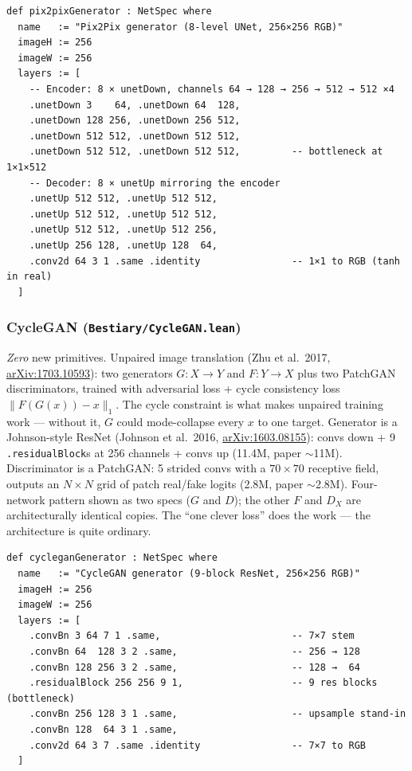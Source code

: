 \begin{verbatim}
def pix2pixGenerator : NetSpec where
  name   := "Pix2Pix generator (8-level UNet, 256×256 RGB)"
  imageH := 256
  imageW := 256
  layers := [
    -- Encoder: 8 × unetDown, channels 64 → 128 → 256 → 512 → 512 ×4
    .unetDown 3    64, .unetDown 64  128,
    .unetDown 128 256, .unetDown 256 512,
    .unetDown 512 512, .unetDown 512 512,
    .unetDown 512 512, .unetDown 512 512,         -- bottleneck at 1×1×512
    -- Decoder: 8 × unetUp mirroring the encoder
    .unetUp 512 512, .unetUp 512 512,
    .unetUp 512 512, .unetUp 512 512,
    .unetUp 512 512, .unetUp 512 256,
    .unetUp 256 128, .unetUp 128  64,
    .conv2d 64 3 1 .same .identity                -- 1×1 to RGB (tanh in real)
  ]
\end{verbatim}

\subsubsection*{CycleGAN (\texttt{Bestiary/CycleGAN.lean})}
\emph{Zero} new primitives. Unpaired image translation (Zhu et
al.\ 2017, \href{https://arxiv.org/abs/1703.10593}{arXiv:1703.10593}): two generators $G : X \to Y$ and $F : Y \to X$ plus two
PatchGAN discriminators, trained with adversarial loss + cycle
consistency loss $\|F(G(x)) - x\|_1$. The cycle constraint is what
makes unpaired training work --- without it, $G$ could mode-collapse
every $x$ to one target. Generator is a Johnson-style ResNet (Johnson et al.\ 2016,
\href{https://arxiv.org/abs/1603.08155}{arXiv:1603.08155}):
convs down + 9 \texttt{.residualBlock}s at 256 channels + convs up
(11.4M, paper $\sim$11M). Discriminator is a PatchGAN: 5 strided
convs with a $70 \times 70$ receptive field, outputs an $N \times N$
grid of patch real/fake logits (2.8M, paper $\sim$2.8M). Four-network
pattern shown as two specs ($G$ and $D$); the other $F$ and
$D_X$ are architecturally identical copies. The ``one clever loss''
does the work --- the architecture is quite ordinary.

\begin{verbatim}
def cycleganGenerator : NetSpec where
  name   := "CycleGAN generator (9-block ResNet, 256×256 RGB)"
  imageH := 256
  imageW := 256
  layers := [
    .convBn 3 64 7 1 .same,                       -- 7×7 stem
    .convBn 64  128 3 2 .same,                    -- 256 → 128
    .convBn 128 256 3 2 .same,                    -- 128 →  64
    .residualBlock 256 256 9 1,                   -- 9 res blocks (bottleneck)
    .convBn 256 128 3 1 .same,                    -- upsample stand-in
    .convBn 128  64 3 1 .same,
    .conv2d 64 3 7 .same .identity                -- 7×7 to RGB
  ]
\end{verbatim}

